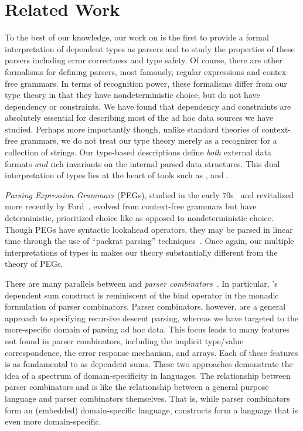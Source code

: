 \section{Related Work}
\label{sec:related}

To the best of our knowledge, our work on \ddc{} is the first to
provide a formal interpretation of dependent types as parsers and to
study the properties of these parsers including error correctness and
type safety. Of course, there are other formalisms for defining
parsers, most famously, regular expressions and contex-free grammars.
In terms of recognition power, these formalisms differ from our type
theory in that they have nondeterministic choice, but do not have
dependency or constraints.  We have found that dependency and
constraints are absolutely essential for describing most of the ad hoc
data sources we have studied.  Perhaps more importantly though, unlike
standard theories of context-free grammars, we do not treat our type
theory merely as a recognizer for a collection of strings.  Our
type-based descriptions define {\em both} external data formats {\em
  and} rich invariants on the internal parsed data structures.  This
dual interpretation of types lies at the heart of tools such as \pads,
\datascript{} and \packettypes{}.

{\em Parsing Expression Grammars} (PEGs), studied in the early
70s~\cite{birman+:parsing} and revitalized more recently by
Ford~\cite{ford:pegs}, evolved from context-free grammars but have
deterministic, prioritized choice like \ddc{} as opposed to
nondeterministic choice.  Though PEGs have syntactic lookahead
operators, they may be parsed in linear time through the use of
``packrat parsing'' techniques~\cite{ford:packrat,grimm:packrat}.
Once again, our multiple interpretations of types in \ddc{} makes our
theory substantially different from the theory of PEGs.

There are many parallels between \ddc{} and {\it parser
  combinators}~\cite{burge:parser-combinators,hutton+:parser-combinators}.
In particular, \ddc{}'s dependent sum construct is reminiscent of the
bind operator in the monadic formulation of parser combinators.
Parser combinators, however, are a general approach to specifying
recursive descent parsing, whereas we have targeted \ddc{} to the
more-specific domain of parsing ad hoc data. This focus leads to many
features not found in parser combinators, including the implicit
type/value correspondence, the error response mechanism, and arrays.
Each of these features is as fundamental to \ddc{} as dependent sums.
These two approaches demonstrate the idea of a spectrum of
domain-specificity in languages. The relationship between parser
combinators and \ddc{} is like the relationship between a general
purpose language and parser combinators themselves. That is, while
parser combinators form an (embedded) domain-specific language, \ddc{}
constructs form a language that is even more domain-specific.
